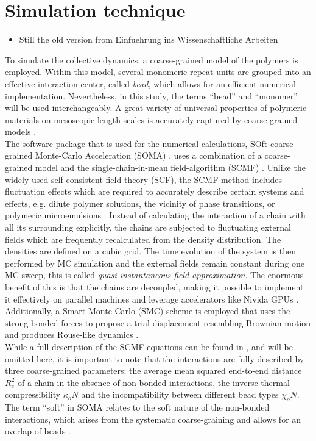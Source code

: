 \documentclass[bachelor,       %
               twoside,        %
               BCOR10mm,       %
               ngerman, english %
               ]{GAUBM}
\begin{document}
\chapter{Simulation technique}
\begin{itemize}
    \item Still the old version from Einfuehrung ins Wissenschaftliche Arbeiten
\end{itemize}
To simulate the collective dynamics, a coarse-grained model of the polymers is employed. Within this model, several monomeric repeat units are grouped into an effective interaction center, called \textit{bead}, which allows for an efficient numerical implementation. Nevertheless, in this study, the terms \enquote{bead} and \enquote{monomer} will be used interchangeably. A great variety of universal properties of polymeric materials on mesoscopic length scales is accurately captured by coarse-grained models \cite{Baschnagel03}.\\
The software package that is used for the numerical calculations, SOft coarse-grained Monte-Carlo Acceleration (SOMA) \cite{Schneider_soma}, uses a combination of a coarse-grained model and the single-chain-in-mean field-algorithm (SCMF) \cite{Daoulas06}. Unlike the widely used self-consistent-field theory (SCF), the SCMF method includes fluctuation effects which are required to accurately describe certain systems and effects, e.g. dilute polymer solutions, the vicinity of phase transitions, or polymeric microemulsions \cite{Bates97, Mueller02, Schmid03}. Instead of calculating the interaction of a chain with all its surrounding explicitly, the chains are subjected to fluctuating external fields which are frequently recalculated from the density distribution. The densities are defined on a cubic grid. The time evolution of the system is then performed by MC simulation and the external fields remain constant during one MC sweep, this is called \textit{quasi-instantaneous field approximation}. The enormous benefit of this is that the chains are decoupled, making it possible to implement it effectively on parallel machines and leverage accelerators like Nivida GPUs \cite{Schneider_soma}. Additionally, a Smart Monte-Carlo (SMC) scheme is employed that uses the strong bonded forces to propose a trial displacement resembling Brownian motion and produces Rouse-like dynamics \cite{Pangali78,Rossky78}.\\
While a full description of the SCMF equations can be found in \cite{Daoulas06}, and will be omitted here, it is important to note that the interactions are fully described by three coarse-grained parameters: the average mean squared end-to-end distance $R_{e}^2$ of a chain in the absence of non-bonded interactions, the inverse thermal compressibility $\kappa_o N$ and the incompatibility between different bead types $\chi_o N$. The term \enquote{soft} in SOMA relates to the soft nature of the non-bonded interactions, which arises from the systematic coarse-graining and allows for an overlap of beads \cite{Mueller11soft}.
\end{document}
